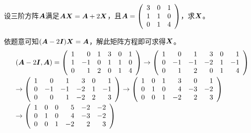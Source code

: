 \begin{frame}

\begin{li}
设三阶方阵$\boldsymbol{A}$满足$\boldsymbol{A}\boldsymbol{X}=\boldsymbol{A}+2\boldsymbol{X}$，且$\boldsymbol{A}=\left(
\begin{array}{rrr}
3&0&1\\
1&1&0\\
0&1&4
\end{array}
\right)$，求$\boldsymbol{X}$。
\end{li}
\pause
\begin{jie}
依题意可知$(\boldsymbol{A}-2\boldsymbol{I})\boldsymbol{X}=\boldsymbol{A}$，解此矩阵方程即可求得$\boldsymbol{X}$。\pause 
$$
\begin{array}{rl}
&(\boldsymbol{A}-2\boldsymbol{I}, \boldsymbol{A})=\left(
\begin{array}{rrrrrr}
  1&0&1&3&0&1\\
  1&-1&0&1&1&0\\
  0&1&2&0&1&4
\end{array}
\right)\rightarrow\left(
\begin{array}{rrrrrr}
  1&0&1&3&0&1\\
  0&-1&-1&-2&1&-1\\
  0&1&2&0&1&4
\end{array}
\right)\\[0.2in]
&\rightarrow\left(
\begin{array}{rrrrrr}
  1&0&1&3&0&1\\
  0&-1&-1&-2&1&-1\\
  0&0&1&-2&2&3
\end{array}
\right)\rightarrow\left(
\begin{array}{rrrrrr}
  1&0&1&3&0&1\\
  0&1&0&4&-3&-2\\
  0&0&1&-2&2&3
\end{array}
\right)\\[0.2in]
&\rightarrow\left(
\begin{array}{rrrrrr}
  1&0&0&5&-2&-2\\
  0&1&0&4&-3&-2\\
  0&0&1&-2&2&3
\end{array}
\right)
\end{array}
$$
\end{jie}
\end{frame}


